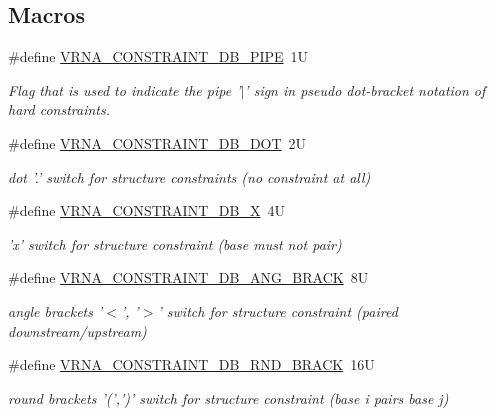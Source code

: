 \subsection*{Macros}
\begin{DoxyCompactItemize}
\item 
\#define \hyperlink{group__constraints_ga13053547a2de5532b64b64d35e097ae1}{V\-R\-N\-A\-\_\-\-C\-O\-N\-S\-T\-R\-A\-I\-N\-T\-\_\-\-D\-B\-\_\-\-P\-I\-P\-E}~1\-U
\begin{DoxyCompactList}\small\item\em Flag that is used to indicate the pipe '$\vert$' sign in pseudo dot-\/bracket notation of hard constraints. \end{DoxyCompactList}\item 
\#define \hyperlink{group__constraints_ga369bea82eae75fbe626f409fa425747e}{V\-R\-N\-A\-\_\-\-C\-O\-N\-S\-T\-R\-A\-I\-N\-T\-\_\-\-D\-B\-\_\-\-D\-O\-T}~2\-U
\begin{DoxyCompactList}\small\item\em dot '.' switch for structure constraints (no constraint at all) \end{DoxyCompactList}\item 
\#define \hyperlink{group__constraints_ga7283bbe0f8954f7b030ecc3f2d1932b2}{V\-R\-N\-A\-\_\-\-C\-O\-N\-S\-T\-R\-A\-I\-N\-T\-\_\-\-D\-B\-\_\-\-X}~4\-U
\begin{DoxyCompactList}\small\item\em 'x' switch for structure constraint (base must not pair) \end{DoxyCompactList}\item 
\#define \hyperlink{group__constraints_gad54c1315a47d55653dcaa5de6e544b77}{V\-R\-N\-A\-\_\-\-C\-O\-N\-S\-T\-R\-A\-I\-N\-T\-\_\-\-D\-B\-\_\-\-A\-N\-G\-\_\-\-B\-R\-A\-C\-K}~8\-U
\begin{DoxyCompactList}\small\item\em angle brackets '$<$', '$>$' switch for structure constraint (paired downstream/upstream) \end{DoxyCompactList}\item 
\#define \hyperlink{group__constraints_gac17b034852c914bc5879954c65d7e74b}{V\-R\-N\-A\-\_\-\-C\-O\-N\-S\-T\-R\-A\-I\-N\-T\-\_\-\-D\-B\-\_\-\-R\-N\-D\-\_\-\-B\-R\-A\-C\-K}~16\-U
\begin{DoxyCompactList}\small\item\em round brackets '(',')' switch for structure constraint (base i pairs base j) \end{DoxyCompactList}\item 

\end{DoxyCompactItemize}
